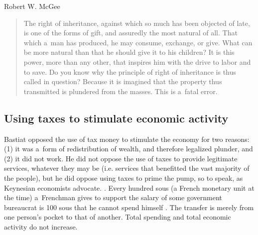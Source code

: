 \begin{artengenv}{Robert W. McGee}
\begin{quote}
The right of inheritance, against which so much has been objected of late, is one of the forms of gift, and assuredly the most natural of all. That which a~man has produced, he may consume, exchange, or give. What can be more natural than that he should give it to his children? It is this power, more than any other, that inspires him with the drive to labor and to save. Do you know why the principle of right of inheritance is thus called in question? Because it is imagined that the property thus transmitted is plundered from the masses. This is a~fatal error. 
\parencite[][p.142]{bastiat_bastiat_2007}%
\end{quote}




\subsection{Using taxes to stimulate economic activity}



Bastiat opposed the use of tax money to stimulate the economy for two reasons: (1) it was a~form of redistribution of wealth, and therefore legalized plunder, and (2) it did not work. He did not oppose the use of taxes to provide legitimate services, whatever they may be (i.e. services that benefitted the vast majority of the people), but he did oppose using taxes to prime the pump, so to speak, as Keynesian economists advocate. 
\parencite[][pp.8–9, 16]{bastiat_selected_1964}. %
 Every hundred sous (a French monetary unit at the time) a~Frenchman gives to support the salary of some government bureaucrat is 100 sous that he cannot spend himself 
\parencite[][p.8]{bastiat_selected_1964}. %
 The transfer is merely from one person's pocket to that of another. Total spending and total economic activity do not increase.




\end{artengenv}
